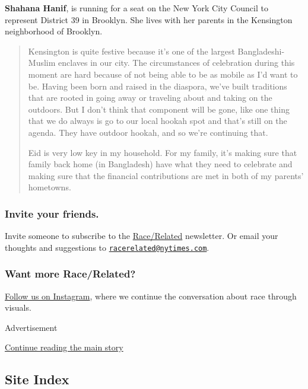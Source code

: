 \textbf{Shahana Hanif}, is running for a seat on the New York City
Council to represent District 39 in Brooklyn. She lives with her parents
in the Kensington neighborhood of Brooklyn.

\begin{quote}
Kensington is quite festive because it's one of the largest
Bangladeshi-Muslim enclaves in our city. The circumstances of
celebration during this moment are hard because of not being able to be
as mobile as I'd want to be. Having been born and raised in the
diaspora, we've built traditions that are rooted in going away or
traveling about and taking on the outdoors. But I don't think that
component will be gone, like one thing that we do always is go to our
local hookah spot and that's still on the agenda. They have outdoor
hookah, and so we're continuing that.

Eid is very low key in my household. For my family, it's making sure
that family back home (in Bangladesh) have what they need to celebrate
and making sure that the financial contributions are met in both of my
parents' hometowns.
\end{quote}

\hypertarget{invite-your-friends}{%
\subsubsection{\texorpdfstring{\textbf{Invite your
friends.}}{Invite your friends.}}\label{invite-your-friends}}

Invite someone to subscribe to the
\href{https://www.nytimes.com/newsletters/race-related?te=1\&nl=race-related\&emc=edit_rr_20190628}{Race/Related}
newsletter. Or email your thoughts and suggestions to
\href{mailto:racerelated@nytimes.com}{\nolinkurl{racerelated@nytimes.com}}.

\hypertarget{want-more-racerelated}{%
\subsubsection{\texorpdfstring{\textbf{Want more
Race/Related?}}{Want more Race/Related?}}\label{want-more-racerelated}}

\href{http://instagram.com/racerelatednyt}{Follow us on Instagram},
where we continue the conversation about race through visuals.

Advertisement

\protect\hyperlink{after-bottom}{Continue reading the main story}

\hypertarget{site-index}{%
\subsection{Site Index}\label{site-index}}

